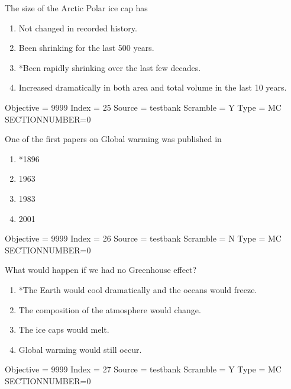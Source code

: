 \documentclass[11pt]{article}
\begin{document}
\begin{enumerate}
\begin{minipage}{\textwidth}
\begin{minipage}{\textwidth}
\item The size of the Arctic Polar ice cap has
\begin{enumerate} 
\setlength{\itemsep}{1pt} 
\setlength{\parskip}{0pt} 
\setlength{\parsep}{0pt}
\setlength{\multicolsep}{1pt} 
\item Not changed in recorded history.
\item Been shrinking for the last 500 years.
\item *Been rapidly shrinking over the last few decades.
\item Increased dramatically in both area and total volume in the last 10 years.
\end{enumerate} 
Objective = 9999
Index = 25
Source = testbank
Scramble = Y
Type = MC
SECTIONNUMBER=0
\end{minipage}
\end{minipage}
\vskip 0.20in

\begin{minipage}{\textwidth}
\begin{minipage}{\textwidth}
\item One of the first papers on Global warming was published in
\begin{multicols}{3}
\begin{enumerate} 
\setlength{\itemsep}{1pt} 
\setlength{\parskip}{0pt} 
\setlength{\parsep}{0pt}
\setlength{\multicolsep}{1pt} 
\item *1896
\item 1963
\item 1983
\item 2001
\end{enumerate} 
\vfill 
\end{multicols}

Objective = 9999
Index = 26
Source = testbank
Scramble = N
Type = MC
SECTIONNUMBER=0
\end{minipage}
\end{minipage}
\vskip 0.20in

\begin{minipage}{\textwidth}
\begin{minipage}{\textwidth}
\item What would happen if we had no Greenhouse effect?
\begin{enumerate} 
\setlength{\itemsep}{1pt} 
\setlength{\parskip}{0pt} 
\setlength{\parsep}{0pt}
\setlength{\multicolsep}{1pt} 
\item *The Earth would cool dramatically and the oceans would freeze.
\item The composition of the atmosphere would change.
\item The ice caps would melt.
\item Global warming would still occur.
\end{enumerate} 
Objective = 9999
Index = 27
Source = testbank
Scramble = Y
Type = MC
SECTIONNUMBER=0
\end{minipage}
\end{minipage}
\vskip 0.20in


\end{enumerate}
\end{document}
